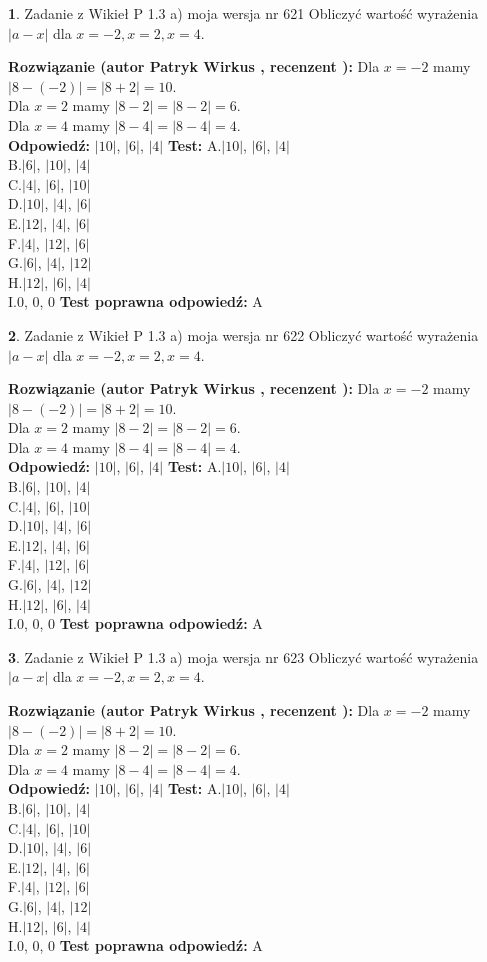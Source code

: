\documentclass[12pt, a4paper]{article}
\theoremstyle{definition} %
\newtheorem{zad}{}
\newcommand{\zadStart}[1]{\begin{zad}#1\newline}
\newcommand{\zadStop}{\end{zad}}
\newcommand{\rozwStart}[2]{\noindent \textbf{Rozwiązanie (autor #1 , recenzent #2): }\newline}
\newcommand{\rozwStop}{\newline}
\newcommand{\odpStart}{\noindent \textbf{Odpowiedź:}\newline}
\newcommand{\odpStop}{\newline}
\newcommand{\testStart}{\noindent \textbf{Test:}\newline}
\newcommand{\testStop}{\newline}
\newcommand{\kluczStart}{\noindent \textbf{Test poprawna odpowiedź:}\newline}
\newcommand{\kluczStop}{\newline}
\begin{document}
\zadStart{Zadanie z Wikieł P 1.3 a) moja wersja nr 621}
Obliczyć wartość wyrażenia $|a - x|$ dla $x=-2,x=2,x=4$.
\zadStop
\rozwStart{Patryk Wirkus}{}
Dla $x = -2$ mamy $|8 - (-2)| = |8 + 2| = 10$.\\
Dla $x = 2$ mamy $|8 - 2| = |8 - 2| = 6$.\\
Dla $x = 4$ mamy $|8 - 4| = |8 - 4| = 4$.\\
\rozwStop
\odpStart
$|10|$, $|6|$, $|4|$
\odpStop
\testStart
A.$|10|$, $|6|$, $|4|$\\
B.$|6|$, $|10|$, $|4|$\\
C.$|4|$, $|6|$, $|10|$\\
D.$|10|$, $|4|$, $|6|$\\
E.$|12|$, $|4|$, $|6|$\\
F.$|4|$, $|12|$, $|6|$\\
G.$|6|$, $|4|$, $|12|$\\
H.$|12|$, $|6|$, $|4|$\\
I.$0$, $0$, $0$
\testStop
\kluczStart
A
\kluczStop



\zadStart{Zadanie z Wikieł P 1.3 a) moja wersja nr 622}
Obliczyć wartość wyrażenia $|a - x|$ dla $x=-2,x=2,x=4$.
\zadStop
\rozwStart{Patryk Wirkus}{}
Dla $x = -2$ mamy $|8 - (-2)| = |8 + 2| = 10$.\\
Dla $x = 2$ mamy $|8 - 2| = |8 - 2| = 6$.\\
Dla $x = 4$ mamy $|8 - 4| = |8 - 4| = 4$.\\
\rozwStop
\odpStart
$|10|$, $|6|$, $|4|$
\odpStop
\testStart
A.$|10|$, $|6|$, $|4|$\\
B.$|6|$, $|10|$, $|4|$\\
C.$|4|$, $|6|$, $|10|$\\
D.$|10|$, $|4|$, $|6|$\\
E.$|12|$, $|4|$, $|6|$\\
F.$|4|$, $|12|$, $|6|$\\
G.$|6|$, $|4|$, $|12|$\\
H.$|12|$, $|6|$, $|4|$\\
I.$0$, $0$, $0$
\testStop
\kluczStart
A
\kluczStop



\zadStart{Zadanie z Wikieł P 1.3 a) moja wersja nr 623}
Obliczyć wartość wyrażenia $|a - x|$ dla $x=-2,x=2,x=4$.
\zadStop
\rozwStart{Patryk Wirkus}{}
Dla $x = -2$ mamy $|8 - (-2)| = |8 + 2| = 10$.\\
Dla $x = 2$ mamy $|8 - 2| = |8 - 2| = 6$.\\
Dla $x = 4$ mamy $|8 - 4| = |8 - 4| = 4$.\\
\rozwStop
\odpStart
$|10|$, $|6|$, $|4|$
\odpStop
\testStart
A.$|10|$, $|6|$, $|4|$\\
B.$|6|$, $|10|$, $|4|$\\
C.$|4|$, $|6|$, $|10|$\\
D.$|10|$, $|4|$, $|6|$\\
E.$|12|$, $|4|$, $|6|$\\
F.$|4|$, $|12|$, $|6|$\\
G.$|6|$, $|4|$, $|12|$\\
H.$|12|$, $|6|$, $|4|$\\
I.$0$, $0$, $0$
\testStop
\kluczStart
A
\kluczStop
\end{document}
